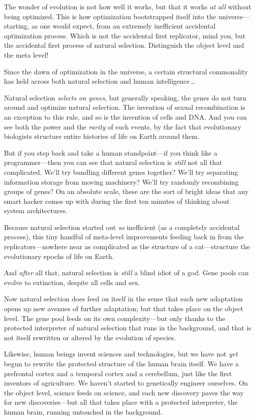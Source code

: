  The wonder of evolution is not how well it works, but that it
works \textit{at all} without being optimized. This is how optimization
bootstrapped itself into the universe---starting, as one would expect,
from an extremely inefficient accidental optimization process. Which is
not the accidental first replicator, mind you, but the accidental first
process of natural selection. Distinguish the object level and the meta
level!


 Since the dawn of optimization in the universe, a certain
structural commonality has held across both natural selection and human
intelligence\,\ldots


 Natural selection \textit{selects on genes}, but generally
speaking, the genes do not turn around and optimize natural selection.
The invention of sexual recombination is an exception to this rule, and
so is the invention of cells and DNA. And you can see both the power
and the \textit{rarity} of such events, by the fact that evolutionary
biologists structure entire histories of life on Earth around them.


 But if you step back and take a human standpoint---if you think
like a programmer---then you can see that natural selection is
\textit{still} not all that complicated. We'll try
bundling different genes together? We'll try separating
information storage from moving machinery? We'll try
randomly recombining groups of genes? On an absolute scale, these are
the sort of bright ideas that any smart hacker comes up with during the
first ten minutes of thinking about system architectures.


 Because natural selection started out \textit{so} inefficient (as
a completely accidental process), this tiny handful of meta-level
improvements feeding back in from the replicators---nowhere near as
complicated as the structure of a cat---structure the evolutionary
epochs of life on Earth.


 And \textit{after} all that, natural selection is \textit{still} a
blind idiot of a god. Gene pools can evolve to extinction, despite all
cells and sex.


 Now natural selection does feed on itself in the sense that each
new adaptation opens up new avenues of further adaptation; but that
takes place on the object level. The gene pool feeds on its own
complexity---but only thanks to the protected interpreter of natural
selection that runs in the background, and that is not itself rewritten
or altered by the evolution of species.


 Likewise, human beings invent sciences and technologies, but we
have not \textit{yet} begun to rewrite the protected structure of the
human brain itself. We have a prefrontal cortex and a temporal cortex
and a cerebellum, just like the first inventors of agriculture. We
haven't started to genetically engineer ourselves. On
the object level, science feeds on science, and each new discovery
paves the way for new discoveries---but all that takes place with a
protected interpreter, the human brain, running untouched in the
background.



